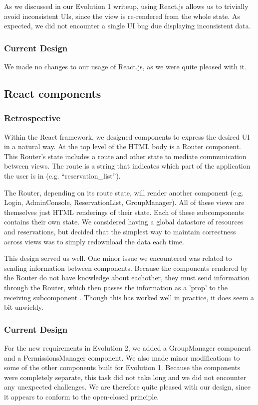 \documentclass[12pt]{article}
\begin{document}
As we discussed in our Evolution 1 writeup, using React.js allows us to trivially avoid inconsistent UIs, since the view is re-rendered from the whole state. As expected, we did not encounter a single UI bug due displaying inconsistent data.

\subsubsection{Current Design}
We made no changes to our usage of React.js, as we were quite pleased with it.

\subsection{React components}
\subsubsection{Retrospective}
Within the React framework, we designed components to express the desired UI in a natural way. At the top level of the HTML body is a Router component. This Router's state includes a route and other state to mediate communication between views. The route is a string that indicates which part of the application the user is in (e.g. ``reservation\_list'').

The Router, depending on its route state, will render another component (e.g. Login, AdminConsole, ReservationList, GroupManager). All of these views are themselves just HTML renderings of their state. Each of these subcomponents contains their own state. We considered having a global datastore of resources and reservations, but decided that the simplest way to maintain correctness across views was to simply redownload the data each time.

This design served us well. One minor issue we encountered was related to sending information between components. Because the components rendered by the Router do not have knowledge about eachother, they must send information through the Router, which then passes the information as a 'prop' to the receiving subcomponent . Though this has worked well in practice, it does seem a bit unwieldy.

\subsubsection{Current Design}
For the new requirements in Evolution 2, we added a GroupManager component and a PermissionsManager component. We also made minor modifications to some of the other components built for Evolution 1. Because the components were completely separate, this task did not take long and we did not encounter any unexpected challenges. We are therefore quite pleased with our design, since it appears to conform to the open-closed principle.
\end{document}
